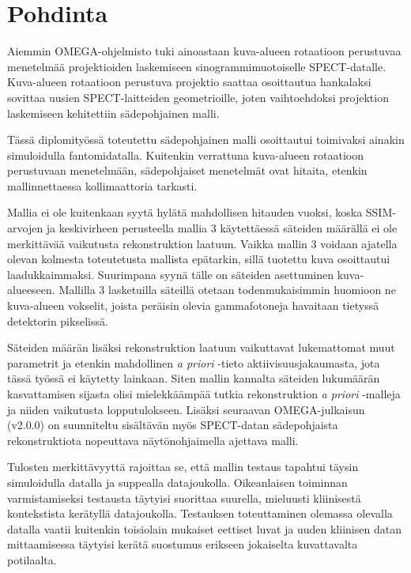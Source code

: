 \section{Pohdinta}
Aiemmin OMEGA-ohjelmisto tuki ainoastaan kuva-alueen rotaatioon perustuvaa menetelmää projektioiden laskemiseen sinogrammimuotoiselle SPECT-datalle. Kuva-alueen rotaatioon perustuva projektio saattaa osoittautua hankalaksi sovittaa uusien SPECT-laitteiden geometrioille, joten vaihtoehdoksi projektion laskemiseen kehitettiin sädepohjainen malli.

Tässä diplomityössä toteutettu sädepohjainen malli osoittautui toimivaksi ainakin simuloidulla fantomidatalla. Kuitenkin verrattuna kuva-alueen rotaatioon perustuvaan menetelmään, sädepohjaiset menetelmät ovat hitaita, etenkin mallinnettaessa kollimaattoria tarkasti.

Mallia ei ole kuitenkaan syytä hylätä mahdollisen hitauden vuoksi, koska SSIM-arvojen ja keskivirheen perusteella mallia 3 käytettäessä säteiden määrällä ei ole merkittävää vaikutusta rekonstruktion laatuun. Vaikka mallin 3 voidaan ajatella olevan kolmesta toteutetusta mallista epätarkin, sillä tuotettu kuva osoittautui laadukkaimmaksi. Suurimpana syynä tälle on säteiden asettuminen kuva-alueeseen. Mallilla 3 lasketuilla säteillä otetaan todenmukaisimmin huomioon ne kuva-alueen vokselit, joista peräisin olevia gammafotoneja havaitaan tietyssä detektorin pikselissä.

Säteiden määrän lisäksi rekonstruktion laatuun vaikuttavat lukemattomat muut parametrit ja etenkin mahdollinen \textit{a priori} -tieto aktiivisuusjakaumasta, jota tässä työssä ei käytetty lainkaan. Siten mallin kannalta säteiden lukumäärän kasvattamisen sijasta olisi mielekkäämpää tutkia rekonstruktion \textit{a priori} -malleja ja niiden vaikutusta lopputulokseen. Lisäksi seuraavan OMEGA-julkaisun (v2.0.0) on suunniteltu sisältävän myös SPECT-datan sädepohjaista rekonstruktiota nopeuttava näytönohjaimella ajettava malli.

Tulosten merkittävyyttä rajoittaa se, että mallin testaus tapahtui täysin simuloidulla datalla ja suppealla datajoukolla. Oikeanlaisen toiminnan varmistamiseksi testausta täytyisi suorittaa suurella, mieluusti kliinisestä kontekstista kerätyllä datajoukolla. Testauksen toteuttaminen olemassa olevalla datalla vaatii kuitenkin toisiolain mukaiset eettiset luvat ja uuden kliinisen datan mittaamisessa täytyisi kerätä suostumus erikseen jokaiselta kuvattavalta potilaalta.